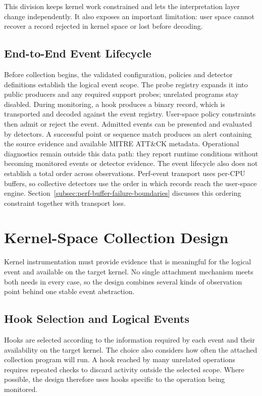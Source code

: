 This division keeps kernel work constrained and lets the interpretation layer
change independently. It also exposes an important limitation: user space
cannot recover a record rejected in kernel space or lost before decoding.

\subsection{End-to-End Event Lifecycle}
\label{subsec:end-to-end-event-lifecycle}

Before collection begins, the validated configuration, policies and detector
definitions establish the logical event scope. The probe registry expands it
into public producers and any required support probes; unrelated programs stay
disabled. During monitoring, a hook produces a binary record, which is
transported and decoded against the event registry. User-space policy
constraints then admit or reject the event. Admitted events can be presented
and evaluated by detectors. A successful point or sequence match produces an
alert containing the source evidence and available MITRE ATT\&CK metadata.
Operational diagnostics remain outside this data path: they report runtime
conditions without becoming monitored events or detector evidence. The event
lifecycle also does not establish a total order across observations.
Perf-event transport uses per-CPU buffers, so collective detectors use the
order in which records reach the user-space engine.
Section~\ref{subsec:perf-buffer-failure-boundaries} discusses this ordering
constraint together with transport loss.

\section{Kernel-Space Collection Design}
\label{sec:kernel-space-collection-design}

Kernel instrumentation must provide evidence that is meaningful for the
logical event and available on the target kernel. No single attachment
mechanism meets both needs in every case, so the design combines several kinds
of observation point behind one stable event abstraction.

\subsection{Hook Selection and Logical Events}
\label{subsec:hook-selection-logical-events}

Hooks are selected according to the information required by each event and
  their availability on the target kernel. The choice also considers how often
  the attached collection program will run. A hook reached by many unrelated
  operations requires repeated checks to discard activity outside the selected
  scope. Where possible, the design therefore uses hooks specific to the
  operation being monitored.

